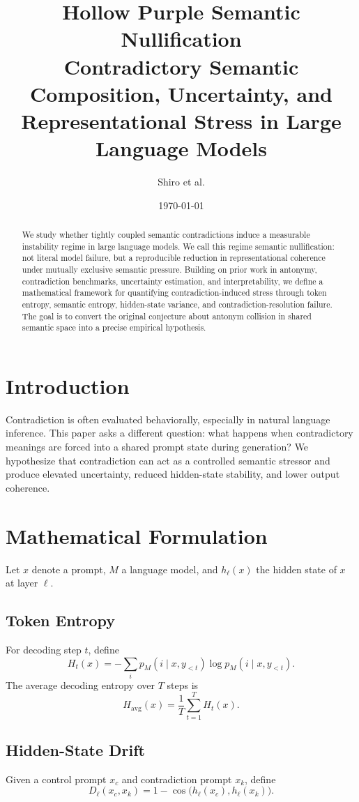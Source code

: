 \documentclass[11pt]{article}
\title{Hollow Purple Semantic Nullification\\\large Contradictory Semantic Composition, Uncertainty, and Representational Stress in Large Language Models}
\author{Shiro et al.}
\date{\today}
\begin{document}
\maketitle

\begin{abstract}
We study whether tightly coupled semantic contradictions induce a measurable instability regime in large language models. We call this regime semantic nullification: not literal model failure, but a reproducible reduction in representational coherence under mutually exclusive semantic pressure. Building on prior work in antonymy, contradiction benchmarks, uncertainty estimation, and interpretability, we define a mathematical framework for quantifying contradiction-induced stress through token entropy, semantic entropy, hidden-state variance, and contradiction-resolution failure. The goal is to convert the original conjecture about antonym collision in shared semantic space into a precise empirical hypothesis.
\end{abstract}

\section{Introduction}
Contradiction is often evaluated behaviorally, especially in natural language inference. This paper asks a different question: what happens when contradictory meanings are forced into a shared prompt state during generation? We hypothesize that contradiction can act as a controlled semantic stressor and produce elevated uncertainty, reduced hidden-state stability, and lower output coherence.

\section{Mathematical Formulation}
Let $x$ denote a prompt, $M$ a language model, and $h_\ell(x)$ the hidden state of $x$ at layer $\ell$.

\subsection{Token Entropy}
For decoding step $t$, define
\[
H_t(x) = - \sum_i p_M(i \mid x, y_{<t}) \log p_M(i \mid x, y_{<t}).
\]
The average decoding entropy over $T$ steps is
\[
H_{\mathrm{avg}}(x) = \frac{1}{T} \sum_{t=1}^T H_t(x).
\]

\subsection{Hidden-State Drift}
Given a control prompt $x_c$ and contradiction prompt $x_k$, define
\[
D_\ell(x_c, x_k) = 1 - \cos\big(h_\ell(x_c), h_\ell(x_k)\big).
\]
\end{document}
